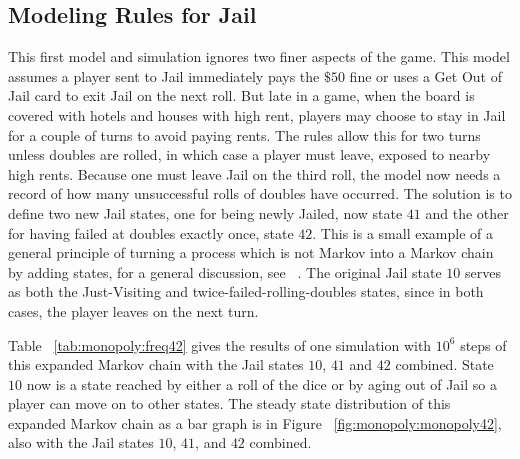 \documentclass[12pt]{article}
\begin{document}
\subsection*{Modeling Rules for Jail}

This first model and simulation ignores two finer aspects of the game.
This model assumes a player sent to Jail immediately pays the \( \$50 \)
fine or uses a Get Out of Jail card to exit Jail on the next roll.  But
late in a game, when the board is covered with hotels and houses with
high rent, players may choose to stay in Jail for a couple of turns to
avoid paying rents.  The rules allow this for two turns unless doubles
are rolled, in which case a player must leave, exposed to nearby high
rents.  Because one must leave Jail on the third roll, the model now
needs a record of how many unsuccessful rolls of doubles have occurred.
The solution is to define two new Jail states, one for being newly
Jailed, now state \( 41 \) and the other for having failed at doubles
exactly once, state \( 42 \).  This is a small example of a general
principle of turning a process which is not Markov into a Markov chain
by adding states, for a general discussion, see~%
\cite{Stroock2016}.  The original Jail state \( 10 \) serves as both the
Just-Visiting and twice-failed-rolling-doubles states, since in both
cases, the player leaves on the next turn.

Table~%
\ref{tab:monopoly:freq42} gives the results of one simulation with \( 10^6
\) steps of this expanded Markov chain with the Jail states \( 10 \), \(
41 \) and \( 42 \) combined.  State \( 10 \) now is a state reached by
either a roll of the dice or by aging out of Jail so a player can move
on to other states.  The steady state distribution of this expanded
Markov chain as a bar graph is in Figure~%
\ref{fig:monopoly:monopoly42}, also with the Jail states \( 10 \), \( 41
\), and \( 42 \) combined.
\end{document}
